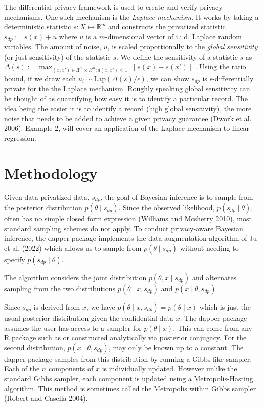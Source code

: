 The differential privacy framework is used to create and verify privacy
mechanisms. One such mechanism is the \emph{Laplace mechanism}. It works by
taking a deterministic statistic \(s: X \mapsto \mathbb{R}^m\) and constructs
the privatized statistic \(s_{dp} := s(x) + u\) where \(u\) is a \(m\)-dimensional
vector of i.i.d. Laplace random variables. The amount of noise, \(u\), is scaled
proportionally to the \emph{global sensitivity} (or just sensitivity) of the statistic \(s\).
We define the sensitivity of a statistic \(s\) as
\(\Delta (s) := \max_{(x,x') \in \mathcal{X}^n \times \mathcal{X}^n; d(x,x') \leq 1} \|s(x) - s(x')\|\).
Using the ratio bound, if we draw
each \(u_i \sim \text{Lap}(\Delta (s) / \epsilon)\), we can show \(s_{dp}\) is \(\epsilon\)-differentially private
for the the Laplace mechanism. Roughly speaking
global sensitivity can be thought of as quantifying how easy it is to identify
a particular record. The idea being the easier it is to identify a record (high global sensitivity),
the more noise that needs to be added to achieve a given privacy guarantee (Dwork et al. 2006). Example 2, will cover an
application of the Laplace mechanism to linear regression.

\hypertarget{methodology}{%
\section{Methodology}\label{methodology}}

Given data privatized data, \(s_{dp}\), the goal of Bayesian inference is to sample from the
posterior distribution \(p(\theta \mid s_{dp})\). Since the observed likelihood,
\(p(s_{dp} \mid \theta)\), often has no simple closed form expression (Williams and Mcsherry 2010), most standard
sampling schemes do not apply. To conduct privacy-aware Bayesian inference, the dapper package implements
the data augmentation algorithm of Ju et al. (2022) which allows us to sample from \(p(\theta \mid s_{dp})\)
without needing to specify \(p(s_{dp} \mid \theta)\).

The algorithm considers the joint distribution \(p(\theta, x \mid s_{dp})\) and
alternates sampling from the two distributions \(p(\theta \mid x, s_{dp})\)
and \(p(x \mid \theta, s_{dp})\).

Since \(s_{dp}\) is derived from \(x\), we have \(p(\theta \mid x, s_{dp}) = p(\theta \mid x)\) which
is just the usual posterior distribution given the confidential data \(x\). The dapper
package assumes the user has access to a sampler for \(p(\theta \mid x)\). This can
come from any R package such as  or constructed analytically via posterior conjugacy.
For the second distribution, \(p(x \mid \theta, s_{dp})\), may
only be known up to a constant. The dapper package samples from this distribution by
running a Gibbs-like sampler. Each of the \(n\) components of \(x\) is individually
updated. However unlike the standard Gibbs sampler, each component is updated
using a Metropolis-Hasting algorithm. This method is sometimes called the Metropolis within Gibbs sampler (Robert and Casella 2004).

